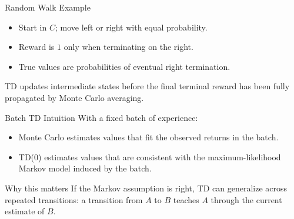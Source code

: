 \documentclass[aspectratio=169]{beamer}
\begin{document}
\begin{frame}{Random Walk Example}
\small
\begin{center}
\end{center}

\vspace{0.6em}
\begin{itemize}
    \item Start in $C$; move left or right with equal probability.
    \item Reward is $1$ only when terminating on the right.
    \item True values are probabilities of eventual right termination.
\end{itemize}

\vspace{0.4em}
TD updates intermediate states before the final terminal reward has been fully propagated by Monte Carlo averaging.
\end{frame}

\begin{frame}{Batch TD Intuition}
\small
With a fixed batch of experience:

\begin{itemize}
    \item Monte Carlo estimates values that fit the observed returns in the batch.
    \item TD(0) estimates values that are consistent with the maximum-likelihood Markov model induced by the batch.
\end{itemize}

\vspace{0.9em}
\begin{block}{Why this matters}
If the Markov assumption is right, TD can generalize across repeated transitions: a transition from $A$ to $B$ teaches $A$ through the current estimate of $B$.
\end{block}
\end{frame}
\end{document}
